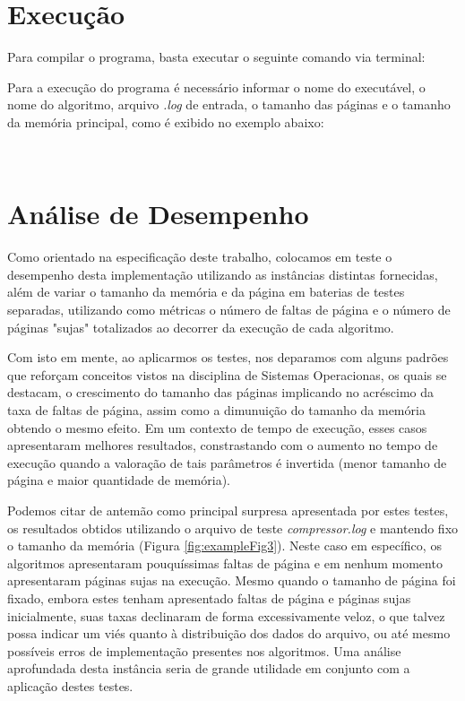 \documentclass[a4paper, 12pt]{article}
\begin{document}
\section{Execução}

Para compilar o programa, basta executar o seguinte comando via terminal:

\begin{center}
\end{center}

Para a execução do programa é necessário informar o nome do executável, o nome do algoritmo, arquivo \emph{.log} de entrada, o tamanho das páginas e o tamanho da memória principal, como é exibido no exemplo abaixo:

\vspace{0.3cm}
\begin{center}
    \\\vspace{0.3cm}
\end{center}
\vspace{0.3cm}

\section{Análise de Desempenho}

Como orientado na especificação deste trabalho, colocamos em teste o desempenho desta implementação utilizando as instâncias distintas fornecidas, além de variar o tamanho da memória e da página em baterias de testes separadas, utilizando como métricas o número de faltas de página e o número de páginas "sujas" totalizados ao decorrer da execução de cada algoritmo.

Com isto em mente, ao aplicarmos os testes, nos deparamos com alguns padrões que reforçam conceitos vistos na disciplina de Sistemas Operacionas, os quais se destacam, o crescimento do tamanho das páginas implicando no acréscimo da taxa de faltas de página, assim como a dimunuição do tamanho da memória obtendo o mesmo efeito. Em um contexto de tempo de execução, esses casos apresentaram melhores resultados, constrastando com o aumento no tempo de execução quando a valoração de tais parâmetros é invertida (menor tamanho de página e maior quantidade de memória).

Podemos citar de antemão como principal surpresa apresentada por estes testes, os resultados obtidos utilizando o arquivo de teste \emph{compressor.log} e mantendo fixo o tamanho da memória (Figura \ref{fig:exampleFig3}). Neste caso em específico, os algoritmos apresentaram pouquíssimas faltas de página e em nenhum momento apresentaram páginas sujas na execução. Mesmo quando o tamanho de página foi fixado, embora estes tenham apresentado faltas de página e páginas sujas inicialmente, suas taxas declinaram de forma excessivamente veloz, o que talvez possa indicar um viés quanto à distribuição dos dados do arquivo, ou até mesmo possíveis erros de implementação presentes nos algoritmos. Uma análise aprofundada desta instância seria de grande utilidade em conjunto com a aplicação destes testes.
\end{document}
